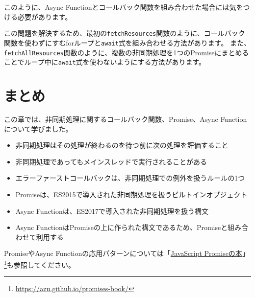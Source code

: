 このように、Async
Functionとコールバック関数を組み合わせた場合には気をつける必要があります。

この問題を解決するため、最初の\texttt{fetchResources}関数のように、コールバック関数を使わずにすむforループと\texttt{await}式を組み合わせる方法があります。
また、\texttt{fetchAllResources}関数のように、複数の非同期処理を1つのPromiseにまとめることでループ中に\texttt{await}式を使わないようにする方法があります。

\hypertarget{conclusion}{%
\section{まとめ}\label{conclusion}}

この章では、非同期処理に関するコールバック関数、Promise、Async
Functionについて学びました。

\begin{itemize}
\item
  非同期処理はその処理が終わるのを待つ前に次の処理を評価すること
\item
  非同期処理であってもメインスレッドで実行されることがある
\item
  エラーファーストコールバックは、非同期処理での例外を扱うルールの1つ
\item
  Promiseは、ES2015で導入された非同期処理を扱うビルトインオブジェクト
\item
  Async Functionは、ES2017で導入された非同期処理を扱う構文
\item
  Async
  FunctionはPromiseの上に作られた構文であるため、Promiseと組み合わせて利用する
\end{itemize}

PromiseやAsync
Functionの応用パターンについては「\href{https://azu.github.io/promises-book/}{JavaScript
Promiseの本}」\footnote{\url{https://azu.github.io/promises-book/}}も参照してください。
